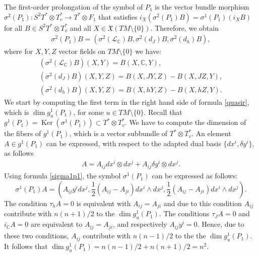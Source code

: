 \documentclass[11pt]{article}
\numberwithin{equation}{section}
\begin{document}
The f\/irst-order prolongation of the symbol of $P_1$ is the vector
bundle morphism $\sigma^2(P_1): S^2T^*\otimes T^*_v \to T^*\otimes
F_1$ that satisf\/ies
$i_X\left(\sigma^2(P_1)B\right)=\sigma^1(P_1)(i_XB)$ for all $B\in
S^2T^*\otimes T^*_v$ and all $X\in {\mathfrak
X}(TM\setminus\{0\})$. Therefore, we obtain
\begin{gather*}
\sigma^2(P_1)B=\left( \sigma^2\left(\mathcal{L}_{\mathbb
C}\right)B, \sigma^2\left(d_J\right)B,
\sigma^2\left(d_h\right)B\right),
\end{gather*} where  for $X, Y, Z$ vector f\/ields on
$TM\setminus\{0\}$ we have:
\begin{gather} \nonumber \left(\sigma^2\left(\mathcal{L}_{\mathbb
C}\right)B\right)(X,Y)   =   B(X, \mathbb{C}, Y), \\
\label{sigma2p1} \left(\sigma^2\left(d_J\right)B\right)(X,Y,Z)   =
B(X, JY,Z)-B(X,JZ,Y), \\
\nonumber \left(\sigma^2\left(d_h\right)B\right)(X,Y,Z)   =
B(X,hY,Z)-B(X,hZ, Y).
\end{gather}
We start by computing the f\/irst term in the right hand side of formula
\eqref{quasir}, which is $\dim g^1_u(P_1)$, for some $u\in
TM\setminus\{0\}$. Recall that $g^1(P_1)=\operatorname{Ker} \left(\sigma^1(P_1)\right)
\subset T^*\otimes T^*_v$.  We have to compute the dimension of
the f\/ibers of $g^1(P_1)$, which is a vector subbundle of $ T^*\otimes T^*_v$. An element $A\in
g^1(P_1)$ can be expressed, with respect to the adapted dual basis
$\{dx^i, \delta y^i\}$, as follows
\begin{gather*}
A=A_{ij}dx^i\otimes dx^j + A_{\underline{i}j}\delta y^i \otimes
dx^j. %
\end{gather*} Using formula \eqref{sigma1p1},
the symbol $\sigma^1(P_1)$ can be expressed as follows:
\[
\sigma^1(P_1)A=\left( A_{\underline{i}j}y^idx^j, \frac{1}{2}(
A_{\underline{i}j}- A_{\underline{j}i})dx^i\wedge dx^j,
\frac{1}{2}(A_{ij}- A_{ji})dx^i\wedge dx^j\right).
\]
The condition $\tau_hA=0$ is equivalent with $A_{ij}=A_{ji}$ and due
to this condition $A_{ij}$ contribute with $n(n+1)/2$ to the $\dim g^1_u(P_1)$. The conditions
$\tau_JA=0$ and $i_{\mathbb{C}}A=0$ are equivalent to
$A_{\underline{i}j}=A_{\underline{j}i}$, and respectively
$A_{\underline{i}j}y^i=0$. Hence, due to these two conditions,
$A_{\underline{i}j}$ contribute
with $n(n-1)/2$ to the the $\dim g^1_u(P_1)$. It follows that $\dim
g^{1}_u(P_1)=n(n-1)/2 + n(n+1)/2 = n^2.$
\end{document}
